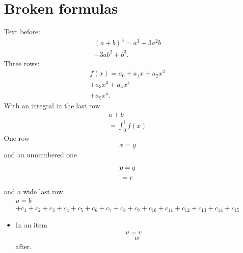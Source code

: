 \documentclass{article}
\begin{document}
\section{Broken formulas}
Text before:
\begin{multline}
  (a+b)^3 = a^3 + 3a^2b \\
  + 3ab^2 + b^3.
\end{multline}
Three rows:
\begin{multline*}
  f(x) = a_0 + a_1 x + a_2 x^2 \\
  + a_3 x^3 + a_4 x^4 \\
  + a_5 x^5.
\end{multline*}
With an integral in the last row
\begin{multline}
  a + b \\
  = \int_0^1 f(x)
\end{multline}
One row \begin{multline} x = y \end{multline} and an unnumbered one
\begin{multline}
  p = q \\ = r \notag
\end{multline}
and a wide last row
\begin{multline}
  a = b \\
  + c_1 + c_2 + c_3 + c_4 + c_5 + c_6 + c_7 + c_8 + c_9 + c_{10} + c_{11} + c_{12} + c_{13} + c_{14} + c_{15}
\end{multline}
\begin{itemize}
\item In an item \begin{multline} u = v \\ = w \end{multline} after.
\end{itemize}
\end{document}
